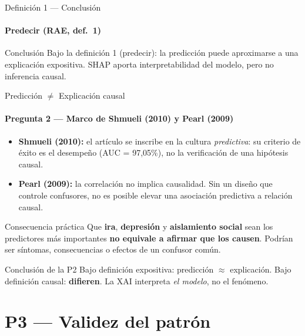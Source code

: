\documentclass[aspectratio=169,11pt]{beamer}
\begin{document}
\begin{frame}{Definición 1 — Conclusión}
  \framesubtitle{Predecir (RAE, def.\ 1)}
  \begin{center}
    \begin{block}{Conclusión}
      Bajo la definición 1 (predecir): la predicción puede aproximarse a una explicación expositiva. SHAP aporta interpretabilidad del modelo, pero no inferencia causal.
    \end{block}
  \end{center}
\end{frame}

\begin{frame}{Predicción $\neq$ Explicación causal}
  \framesubtitle{Pregunta 2 — Marco de Shmueli (2010) y Pearl (2009)}
  \begin{itemize}
        \item \textbf{Shmueli (2010):} el artículo se inscribe en la cultura \textit{predictiva}:
          su criterio de éxito es el desempeño (AUC = 97{,}05\%), no la
          verificación de una hipótesis causal.
    \item \textbf{Pearl (2009):} la correlación no implica causalidad.
          Sin un diseño que controle confusores, no es posible elevar una
          asociación predictiva a relación causal.
  \end{itemize}
  \vspace{0.3em}
  \begin{alertblock}{Consecuencia práctica}
    Que \textbf{ira}, \textbf{depresión} y \textbf{aislamiento social} sean los predictores
    más importantes \textbf{no equivale a afirmar que los causen}.
    Podrían ser síntomas, consecuencias o efectos de un confusor común.
  \end{alertblock}
  \vspace{0.2em}
  \begin{block}{Conclusión de la P2}
    Bajo definición expositiva: predicción $\approx$ explicación.
    Bajo definición causal: \textbf{difieren}. La XAI interpreta \textit{el modelo}, no el fenómeno.
  \end{block}
\end{frame}

\section{P3 — Validez del patrón}
\end{document}
